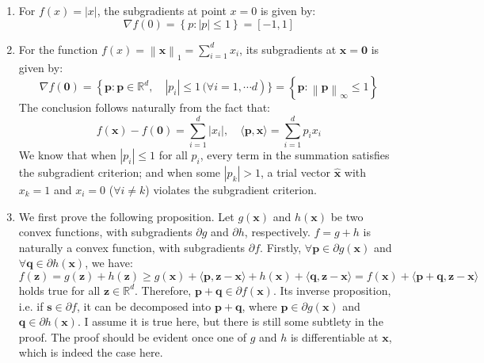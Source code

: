 \documentclass[a4paper, 10pt]{article}
\begin{document}
\begin{enumerate}[label=(\alph*)]
    \item For $f(x) = |x|$, the subgradients at point $x=0$ is given by:
    \begin{equation}
        \nabla f(0) = \left\{ p: |p| \leq 1\right\} = [-1, 1]
    \end{equation}
    
    \item For the function $f(x) = \left\|\mathbf{x}\right\|_1 = \sum_{i=1}^d x_i$, its subgradients at $\mathbf{x} = \mathbf{0}$ is given by:
    \begin{equation}
        \nabla f(\mathbf{0}) = \left\{\mathbf{p}: \mathbf{p} \in \mathbb{R}^d,\quad |p_i| \leq 1\, (\forall i=1,\cdots d\right)\} = \left\{ \mathbf{p}: \left\|\mathbf{p}\right\|_\infty \leq 1 \right\}
    \end{equation}
    The conclusion follows naturally from the fact that:
    \begin{equation}
        f(\mathbf{x}) - f(\mathbf{0}) = \sum_{i=1}^d |x_i|,\quad \langle \mathbf{p}, \mathbf{x} \rangle = \sum_{i=1}^d p_i x_i
    \end{equation}
    We know that when $|p_i| \leq 1$ for all $p_i$, every term in the summation satisfies the subgradient criterion; and when some $|p_k| > 1$, a trial vector $\hat{\mathbf{x}}$ with $x_k = 1$ and $x_i=0$ ($\forall i\neq k$) violates the subgradient criterion.
    
    \item We first prove the following proposition. Let $g(\mathbf{x})$ and $h(\mathbf{x})$ be two convex functions, with subgradients $\partial g$ and $\partial h$, respectively. $f = g + h$ is naturally a convex function, with subgradients $\partial f$. Firstly, $\forall \mathbf{p} \in \partial g(\mathbf{x})$ and $\forall \mathbf{q} \in \partial h(\mathbf{x})$, we have:
    \begin{equation}
        f(\mathbf{z}) = g(\mathbf{z}) + h(\mathbf{z}) \geq g(\mathbf{x}) + \langle \mathbf{p}, \mathbf{z} - \mathbf{x} \rangle +  h(\mathbf{x}) + \langle \mathbf{q}, \mathbf{z} - \mathbf{x} \rangle = f(\mathbf{x}) + \langle \mathbf{p} + \mathbf{q}, \mathbf{z} - \mathbf{x} \rangle
    \end{equation}
    holds true for all $\mathbf{z} \in \mathbb{R}^d$. Therefore, $\mathbf{p} + \mathbf{q} \in \partial f(\mathbf{x})$. Its inverse proposition, i.e. if $\mathbf{s} \in \partial f$, it can be decomposed into $\mathbf{p} + \mathbf{q}$, where $\mathbf{p}\in \partial g(\mathbf{x})$ and $\mathbf{q} \in \partial h(\mathbf{x})$. I assume it is true here, but there is still some subtlety in the proof. The proof should be evident once one of $g$ and $h$ is differentiable at $\mathbf{x}$, which is indeed the case here.
    

\end{enumerate}
\end{document}
